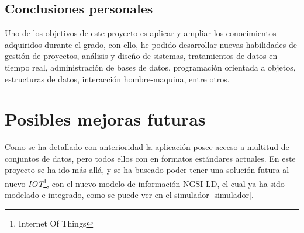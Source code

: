 \subsection{Conclusiones personales}
Uno de los objetivos de este proyecto es aplicar y ampliar los conocimientos adquiridos durante el grado, con ello, he podido desarrollar nuevas habilidades de gestión de proyectos, análisis y diseño de sistemas, tratamientos de datos en tiempo real, administración de bases de datos, programación orientada a objetos, estructuras de datos, interacción hombre-maquina, entre otros.


\section{Posibles mejoras futuras}

Como se ha detallado con anterioridad la aplicación posee acceso a multitud de conjuntos de datos, pero todos ellos con en formatos estándares actuales. En este proyecto se ha ido más allá, y se ha buscado poder tener una solución futura al nuevo \textit{IOT}\footnote{Internet Of Things}, con el nuevo modelo de información NGSI-LD, el cual ya ha sido modelado e integrado, como se puede ver en el simulador \ref{simulador}.